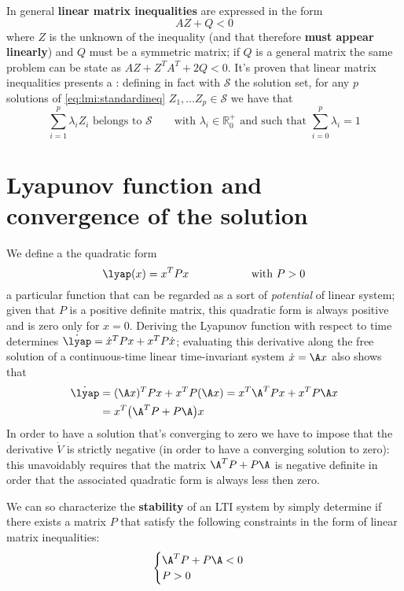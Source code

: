 	In general \textbf{linear matrix inequalities} are expressed in the form
	\begin{equation} \label{eq:lmi:standardineq}
		A Z + Q < 0
	\end{equation}
	where $Z$ is the unknown of the inequality (and that therefore \textbf{must appear linearly}) and $Q$ must be a symmetric matrix; if $Q$ is a general matrix the same problem can be state as $AZ + Z^TA^T + 2 Q < 0$. It's proven that linear matrix inequalities presents a : defining in fact with $\mathscr S$ the solution set, for any $p$ solutions of \ref{eq:lmi:standardineq} $Z_1,\dots Z_p \in \mathscr S$ we have that 
	\[ \sum_{i=1}^p \lambda_i Z_i \textrm{ belongs to } \mathscr S \qquad \textrm{with } \lambda_i \in \mathds R^+_0 \textrm{ and such that } \sum_{i=0}^{p} \lambda_i = 1 \] 
	
\section{Lyapunov function and convergence of the solution}
	We define a  the quadratic form
	\begin{equation}
		\lyap(x) = x^T P x \hspace{2cm} \textrm{with } P > 0
	\end{equation}
	a particular function that can be regarded as a sort of \textit{potential} of linear system; given that $P$ is a positive definite matrix, this quadratic form is always positive and is zero only for $x = 0$. Deriving the Lyapunov function with respect to time determines $\dot \lyap = \dot x^T P x + x^T P \dot x$; evaluating this derivative along the free solution of a continuous-time linear time-invariant system $\dot x = \A x$ also shows that
	\begin{equation}
	\begin{split}
		\dot \lyap & = (\A x)^T P x + x^TP(\A x) = x^T \A^T P x + x^T P\A x \\
		& = x^T\big(\A^T P + P \A \big)x
	\end{split}
	\end{equation}
	In order to have a solution that's converging to zero we have to impose that the derivative $\dot V$ is strictly negative (in order to have a converging solution to zero): this unavoidably requires that the matrix $\A^T P + P\A$ is negative definite in order that the associated quadratic form is always less then zero.
	
	We can so characterize the \textbf{stability} of an LTI system by simply determine if there exists a matrix $P$ that satisfy the following constraints in the form of linear matrix inequalities:
	\begin{equation} \label{eq:lmi:stability}
	\begin{cases}
		\A^T P + P \A < 0 \\
		P > 0
	\end{cases}
	\end{equation}
	
